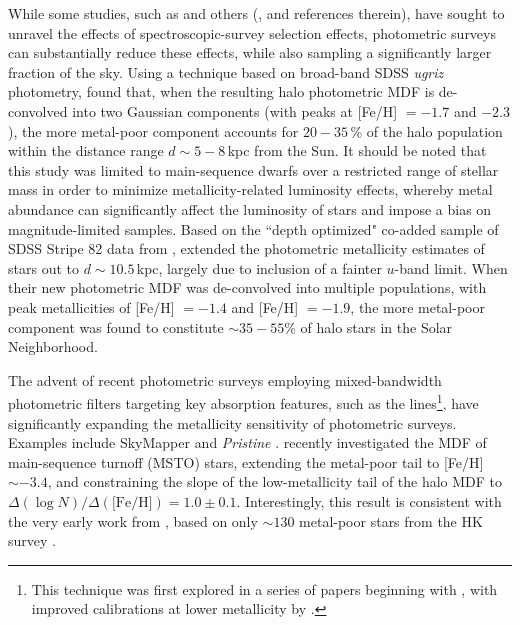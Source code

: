 \documentclass[twocolumn,trackchanges]{aastex63}
\begin{document}
While some studies, such as \citet{Bovy:2012} and others (\citealt{Mints:2019}, and references therein), have sought to unravel the effects of spectroscopic-survey selection effects, photometric surveys can substantially reduce these effects, while also sampling a significantly larger fraction of the sky. Using a technique based on broad-band SDSS \textit{ugriz} photometry, \citet{An:2013} found that, when the resulting halo photometric MDF is de-convolved into two Gaussian components (with peaks at [Fe/H] $=-1.7$ and $-2.3$), the more metal-poor component accounts for $20-35$\,\% of the halo population within the distance range $d \sim 5-8$\,kpc from the Sun. It should be noted that this study was limited to main-sequence dwarfs over a restricted range of stellar mass in order to minimize metallicity-related luminosity effects, whereby metal abundance can significantly affect the luminosity of stars and impose a bias on magnitude-limited samples. Based on the ``depth optimized" co-added sample of SDSS Stripe 82 data from \citet{Jiang:2014}, \citet{An:2015} extended the photometric metallicity estimates of stars out to $d \sim 10.5$\,kpc, largely due to inclusion of a fainter $u$-band limit. When their new photometric MDF was de-convolved into multiple populations, with peak metallicities of [Fe/H] $=-1.4$ and [Fe/H] $=-1.9$, the more metal-poor component was found to constitute $\sim35-55\%$ of halo stars in the Solar Neighborhood.

The advent of recent photometric surveys employing mixed-bandwidth photometric filters targeting key absorption features, such as the  lines\footnote{This technique was first explored in a series of papers beginning with \citet{Anthony-Twarog:1991}, with improved calibrations at lower metallicity by \citet{Anthony-Twarog:2000}.}, have significantly expanding the metallicity sensitivity of photometric surveys. Examples include SkyMapper \citep{Keller:2007} and \textit{Pristine} \citep{Starkenburg:2017}. \citet{Youakim:2020} recently investigated the MDF of main-sequence turnoff (MSTO) stars, extending the metal-poor tail to [Fe/H] $ \sim -3.4$, and constraining the slope of the low-metallicity tail of the halo MDF to $\Delta(\log{N})/\Delta(\textrm{[Fe/H]}) = 1.0 \pm 0.1$. Interestingly, this result is consistent with the very early work from \citet{Beers:1987}, based on only $\sim 130$ metal-poor stars from the HK survey \citep{Beers:1985}.
\end{document}
